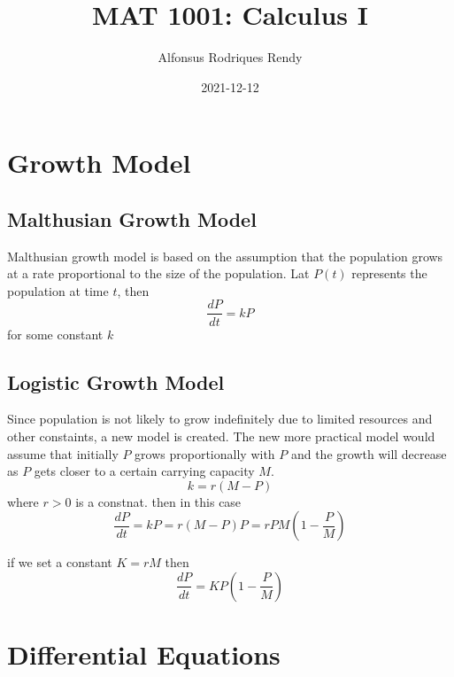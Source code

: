 \documentclass[12pt]{article}
\title{MAT 1001: Calculus I}
\author{Alfonsus Rodriques Rendy}
\date{2021-12-12}
\begin{document}
\begin{center}
    \hspace*{-0.5cm}
\end{center}

\section{Growth Model}
\subsection{Malthusian Growth Model}
Malthusian growth model is based on the assumption that the population grows at 
a rate proportional to the size of the population. Lat $P(t)$ represents the population at time $t$, then
\[
    \frac{dP}{dt} = kP 
\]
for some constant $k$

\subsection{Logistic Growth Model}
Since population is not likely to grow indefinitely due to limited resources and other constaints, a new model is created. The new more practical
model would assume that initially $P$ grows proportionally with $P$ and the growth will decrease as $P$ gets closer to a certain carrying capacity $M$.
\[
    k = r(M - P)
\]
where $r > 0$ is a constnat. then in this case 
\[
    \frac{dP}{dt} = kP = r(M - P)P = rPM(1 - \frac{P}{M})
\]

if we set a constant $K = rM$ then
\[
    \frac{dP}{dt} = KP(1 - \frac{P}{M})
\]
\section{Differential Equations}
\end{document}
